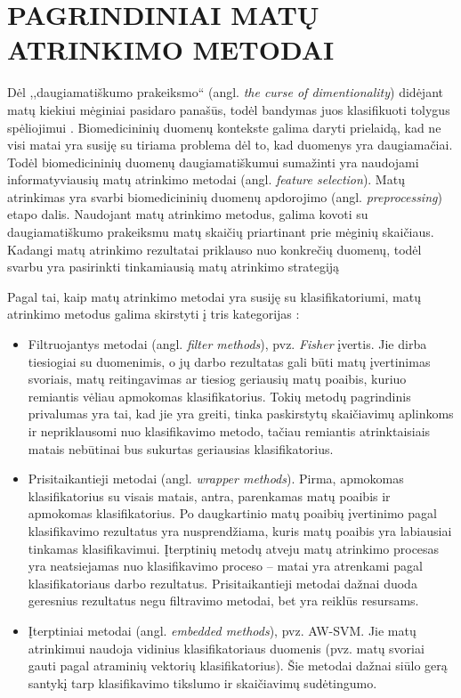 \section{PAGRINDINIAI MATŲ ATRINKIMO METODAI}
\label{pagrindiniai_matu_atrinkimo_motodai}

Dėl ,,daugiamatiškumo prakeiksmo`` (angl. \textit{the curse of dimentionality}) didėjant matų kiekiui mėginiai pasidaro panašūs, todėl bandymas juos klasifikuoti tolygus spėliojimui \cite{bellman1966adaptive}. Biomedicininių duomenų kontekste galima daryti prielaidą, kad ne visi matai yra susiję su tiriama problema dėl to, kad duomenys yra daugiamačiai.
Todėl biomedicininių duomenų daugiamatiškumui sumažinti yra naudojami informatyviausių matų atrinkimo metodai \cite{guyon2003introduction} (angl. \textit{feature selection}). Matų atrinkimas yra svarbi biomedicininių duomenų apdorojimo (angl. \textit{preprocessing}) etapo dalis. Naudojant matų atrinkimo metodus, galima kovoti su daugiamatiškumo prakeiksmu matų skaičių priartinant prie mėginių skaičiaus. Kadangi matų atrinkimo rezultatai priklauso nuo konkrečių duomenų, todėl svarbu yra pasirinkti tinkamiausią matų atrinkimo strategiją

Pagal tai, kaip matų atrinkimo metodai yra susiję su klasifikatoriumi, matų atrinkimo metodus galima skirstyti į tris kategorijas \cite{saeys2008robust}:
\begin{itemize}
 \item Filtruojantys metodai (angl. \textit{filter methods}), pvz. \textit{Fisher} įvertis. Jie dirba tiesiogiai su duomenimis, o jų darbo rezultatas gali būti matų įvertinimas svoriais, matų reitingavimas ar tiesiog geriausių matų poaibis, kuriuo remiantis vėliau apmokomas klasifikatorius. Tokių metodų pagrindinis privalumas yra tai, kad jie yra greiti, tinka paskirstytų skaičiavimų aplinkoms ir nepriklausomi nuo klasifikavimo  metodo, tačiau remiantis atrinktaisiais matais nebūtinai bus sukurtas geriausias klasifikatorius.
 \item Prisitaikantieji metodai (angl. \textit{wrapper methods}). Pirma, apmokomas klasifikatorius su visais matais, antra, parenkamas matų poaibis ir apmokomas klasifikatorius. Po daugkartinio matų poaibių įvertinimo pagal klasifikavimo rezultatus yra nusprendžiama, kuris matų poaibis yra labiausiai tinkamas klasifikavimui. Įterptinių metodų atveju matų atrinkimo procesas yra neatsiejamas nuo klasifikavimo proceso -- matai yra atrenkami pagal klasifikatoriaus darbo rezultatus. Prisitaikantieji metodai dažnai duoda geresnius rezultatus negu filtravimo metodai, bet yra reiklūs resursams.
 \item Įterptiniai metodai (angl. \textit{embedded methods}), pvz. AW-SVM\cite{vapnik2000nature}. Jie matų atrinkimui naudoja vidinius klasifikatoriaus duomenis (pvz. matų svoriai gauti pagal atraminių vektorių klasifikatorius). Šie metodai dažnai siūlo gerą santykį tarp klasifikavimo tikslumo ir skaičiavimų sudėtingumo.
\end{itemize}

